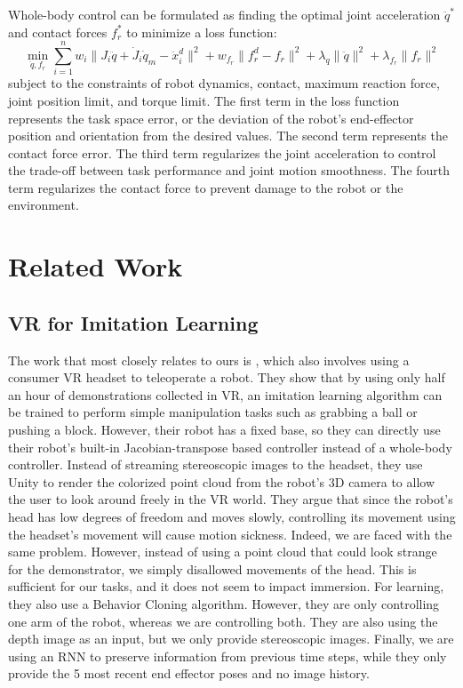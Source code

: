 Whole-body control can be formulated as finding the optimal joint acceleration $\ddot{q}^*$ and contact forces $f_r^*$ to minimize a loss function: 
$$
\min_{\ddot{q}, f_r}
 \sum_{i=1}^{n} 
  w_i \|J_i\ddot{q} 
   +\dot{J}_i\dot{q}_m
   -\ddot{x}_i^d\|^2
  +w_{f_r} \| f_r^d - f_r\|^2
  +\lambda_q \|\ddot{q}\|^2
  +\lambda_{f_r} \|f_r\|^2
$$
subject to the constraints of robot dynamics, contact, maximum reaction force, joint position limit, and torque limit.
The first term in the loss function represents the task space error, or the deviation of the robot's end-effector position and orientation from the desired values. The second term represents the contact force error. The third term regularizes the joint acceleration to control the trade-off between task performance and joint motion smoothness. The fourth term regularizes the contact force to prevent damage to the robot or the environment.

\section{Related Work}

\subsection{VR for Imitation Learning}

The work that most closely relates to ours is \cite{zhang2018deep}, which also involves using a consumer VR headset to teleoperate a robot. They show that by using only half an hour of demonstrations collected in VR, an imitation learning algorithm can be trained to perform simple manipulation tasks such as grabbing a ball or pushing a block. 
However, their robot has a fixed base, so they can directly use their robot's built-in Jacobian-transpose based controller instead of a whole-body controller. 
Instead of streaming stereoscopic images to the headset, they use Unity to render the colorized point cloud from the robot's 3D camera to allow the user to look around freely in the VR world. 
They argue that since the robot's head has low degrees of freedom and moves slowly, controlling its movement using the headset's movement will cause motion sickness. 
Indeed, we are faced with the same problem. 
However, instead of using a point cloud that could look strange for the demonstrator, we simply disallowed movements of the head.
This is sufficient for our tasks, and it does not seem to impact immersion. 
For learning, they also use a Behavior Cloning algorithm. 
However, they are only controlling one arm of the robot, whereas we are controlling both. 
They are also using the depth image as an input, but we only provide stereoscopic images. 
Finally, we are using an RNN to preserve information from previous time steps, while they only provide the 5 most recent end effector poses and no image history. 

